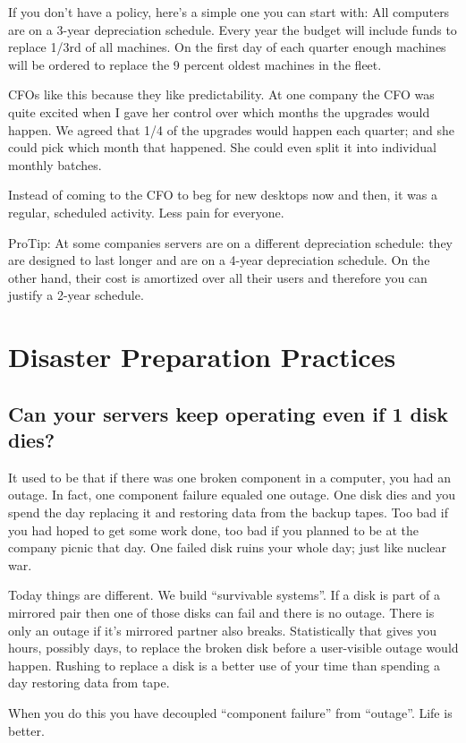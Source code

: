 \documentclass{article}
\begin{document}
If you don't have a policy, here's a simple one you can start with: All computers are on a 3-year depreciation schedule. Every year the budget will include funds to replace 1/3rd of all machines. On the first day of each quarter enough machines will be ordered to replace the 9 percent oldest machines in the fleet.

CFOs like this because they like predictability. At one company the CFO was quite excited when I gave her control over which months the upgrades would happen. We agreed that 1/4 of the upgrades would happen each quarter; and she could pick which month that happened. She could even split it into individual monthly batches.

Instead of coming to the CFO to beg for new desktops now and then, it was a regular, scheduled activity. Less pain for everyone.

ProTip: At some companies servers are on a different depreciation schedule: they are designed to last longer and are on a 4-year depreciation schedule. On the other hand, their cost is amortized over all their users and therefore you can justify a 2-year schedule.

\section{Disaster Preparation Practices}
\subsection{Can your servers keep operating even if 1 disk dies?}
It used to be that if there was one broken component in a computer, you had an outage. In fact, one component failure equaled one outage. One disk dies and you spend the day replacing it and restoring data from the backup tapes. Too bad if you had hoped to get some work done, too bad if you planned to be at the company picnic that day. One failed disk ruins your whole day; just like nuclear war.

Today things are different. We build ``survivable systems''. If a disk is part of a mirrored pair then one of those disks can fail and there is no outage. There is only an outage if it's mirrored partner also breaks. Statistically that gives you hours, possibly days, to replace the broken disk before a user-visible outage would happen. Rushing to replace a disk is a better use of your time than spending a day restoring data from tape.

When you do this you have decoupled ``component failure'' from ``outage''. Life is better.
\end{document}

